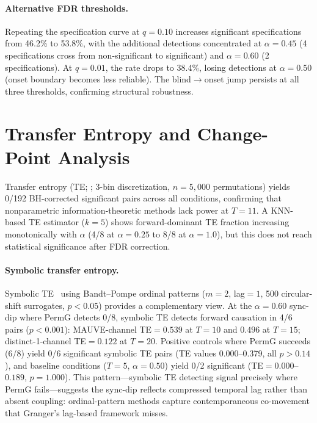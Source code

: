 \paragraph{Alternative FDR thresholds.}
Repeating the specification curve at $q{=}0.10$ increases significant specifications from 46.2\% to 53.8\%, with the additional detections concentrated at $\alpha{=}0.45$ (4 specifications cross from non-significant to significant) and $\alpha{=}0.60$ (2 specifications).
At $q{=}0.01$, the rate drops to 38.4\%, losing detections at $\alpha{=}0.50$ (onset boundary becomes less reliable).
The blind$\to$onset jump persists at all three thresholds, confirming structural robustness.

\section{Transfer Entropy and Change-Point Analysis}
\label{app:transfer_entropy}
\label{app:te_mi}

Transfer entropy (TE; \citealp{schreiber2000measuring}; 3-bin discretization, $n{=}5{,}000$ permutations) yields 0/192 BH-corrected significant pairs across all conditions, confirming that nonparametric information-theoretic methods lack power at $T{=}11$.
A KNN-based TE estimator ($k{=}5$) shows forward-dominant TE fraction increasing monotonically with $\alpha$ (4/8 at $\alpha{=}0.25$ to 8/8 at $\alpha{=}1.0$), but this does not reach statistical significance after FDR correction.

\paragraph{Symbolic transfer entropy.}
Symbolic TE~\citep{staniek2008symbolic} using Bandt--Pompe ordinal patterns ($m{=}2$, lag${=}1$, 500 circular-shift surrogates, $p{<}0.05$) provides a complementary view.
At the $\alpha{=}0.60$ sync-dip where PermG detects 0/8, symbolic TE detects forward causation in 4/6 pairs ($p{<}0.001$): MAUVE-channel TE${=}0.539$ at $T{=}10$ and $0.496$ at $T{=}15$; distinct-1-channel TE${=}0.122$ at $T{=}20$.
Positive controls where PermG succeeds (6/8) yield 0/6 significant symbolic TE pairs (TE values 0.000--0.379, all $p{>}0.14$), and baseline conditions ($T{=}5$, $\alpha{=}0.50$) yield 0/2 significant (TE${=}0.000$--$0.189$, $p{=}1.000$).
This pattern---symbolic TE detecting signal precisely where PermG fails---suggests the sync-dip reflects compressed temporal lag rather than absent coupling: ordinal-pattern methods capture contemporaneous co-movement that Granger's lag-based framework misses.

